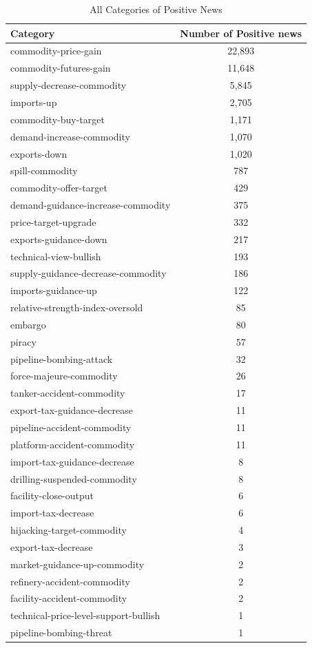 \documentclass[12pt]{article}
\begin{document}
	\begin{table}[H]
		\centering
		\small
		\caption{All Categories of Positive News}
		\begin{tabular}{l|c}
			\toprule
			Category & Number of Positive news \\
			\midrule
commodity-price-gain&22,893\\
commodity-futures-gain&11,648\\
supply-decrease-commodity&5,845\\
imports-up&2,705\\
commodity-buy-target&1,171\\
demand-increase-commodity&1,070\\
exports-down&1,020\\
spill-commodity&787\\
commodity-offer-target&429\\
demand-guidance-increase-commodity&375\\
price-target-upgrade&332\\
exports-guidance-down&217\\
technical-view-bullish&193\\
supply-guidance-decrease-commodity&186\\
imports-guidance-up&122\\
relative-strength-index-oversold&85\\
embargo&80\\
piracy&57\\
pipeline-bombing-attack&32\\
force-majeure-commodity&26\\
tanker-accident-commodity&17\\
export-tax-guidance-decrease&11\\
pipeline-accident-commodity&11\\
platform-accident-commodity&11\\
import-tax-guidance-decrease&8\\
drilling-suspended-commodity&8\\
facility-close-output&6\\
import-tax-decrease&6\\
hijacking-target-commodity&4\\
export-tax-decrease&3\\
market-guidance-up-commodity&2\\
refinery-accident-commodity&2\\
facility-accident-commodity&2\\
technical-price-level-support-bullish&1\\
pipeline-bombing-threat&1\\
	\bottomrule
	\end{tabular}
	\end{table}
\end{document}
